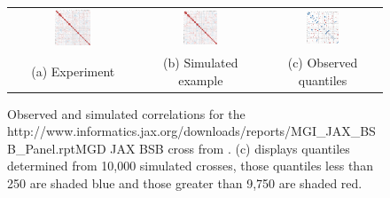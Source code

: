 \documentclass{article}
\newcommand{\href}[1]{#1} %
\begin{document}
\begin{figure}[htp]
  \begin{center}
    \begin{tabular}{ccc}
      \includegraphics[width = 0.300\textwidth]{./img/jaxbsb.png} &
      \includegraphics[width = 0.300\textwidth]{./img/jaxbsb_sim.png} &
      \includegraphics[width = 0.300\textwidth]{./img/jaxbsb_quant.png} \\
      {\footnotesize (a) Experiment} &
      {\footnotesize (b) Simulated example} &
      {\footnotesize (c) Observed quantiles} \\                            
    \end{tabular}
  \end{center}
  \caption{Observed and simulated correlations for the \href{http://www.informatics.jax.org/downloads/reports/MGI_JAX_BSB_Panel.rpt}{MGD JAX BSB cross} from \cite{roweetal1994jaxbsb}. (c) displays quantiles determined from 10,000 simulated crosses, those quantiles less than 250 are shaded blue and those greater than 9,750 are shaded red.}
  \label{fig:jaxbsb}
\end{figure}
\end{document}
